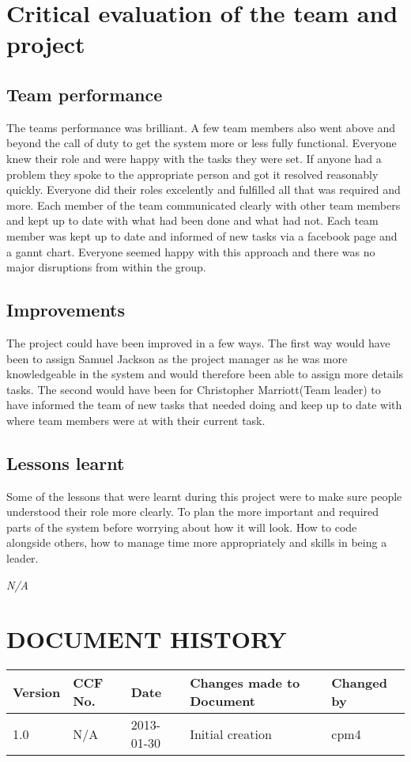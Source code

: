 \documentclass{project}
\begin{document}
\section{Critical evaluation of the team and project}
\subsection{Team performance}
The teams performance was brilliant. A few team members also went above and beyond the call of duty to get the system more or less fully functional. Everyone knew their role and were happy with the tasks they were set. If anyone had a problem they spoke to the appropriate person and got it resolved reasonably quickly. Everyone did their roles excelently and fulfilled all that was required and more. Each member of the team communicated clearly with other team members and kept up to date with what had been done and what had not. Each team member was kept up to date and informed of new tasks via a facebook page and a gannt chart. Everyone seemed happy with this approach and there was no major disruptions from within the group.

\subsection{Improvements}
The project could have been improved in a few ways. The first way would have been to assign Samuel Jackson as the project manager as he was more knowledgeable in the system and would therefore been able to assign more details tasks. The second would have been for Christopher Marriott(Team leader) to have informed the team of new tasks that needed doing and keep up to date with where team members were at with their current task.

\subsection{Lessons learnt}
Some of the lessons that were learnt during this project were to make sure people understood their role more clearly. To plan the more important and required parts of the system before worrying about how it will look. How to code alongside others, how to manage time more appropriately and skills in being a leader.

\clearpage
{}
\begin{thebibliography}{5}
\bibitem{} \emph{N/A}
\end{thebibliography}
\clearpage
{}
\section*{DOCUMENT HISTORY}
\begin{tabular}{|l | l | l | l | l |}
\hline
Version & CCF No. & Date & Changes made to Document & Changed by \\
\hline
1.0 & N/A & 2013-01-30 & Initial creation & cpm4 \\
\hline
\end{tabular}
\label{thelastpage}
\end{document}
